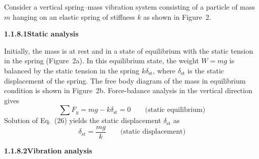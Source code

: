 
Consider a vertical spring--mass vibration system consisting of a particle of mass $m$ hanging on an elastic spring of stiffness $k$ as shown in Figure~2.

{\normalsize\bfseries\color{Graphite} 1.1.8.1\quad Static analysis\par}

Initially, the mass is at rest and in a state of equilibrium with the static tension in the spring (Figure~2a). In this equilibrium state, the weight $W=mg$ is balanced by the static tension in the spring $k\delta_{\mathrm{st}}$, where $\delta_{\mathrm{st}}$ is the static displacement of the spring. The free body diagram of the mass in equilibrium condition is shown in Figure~2b. Force-balance analysis in the vertical direction gives
\begin{equation}
    \sum F_y=mg-k\delta_{\mathrm{st}}=0 \qquad\text{(static equilibrium)} \tag{26}
\end{equation}
Solution of Eq.~(26) yields the static displacement $\delta_{\mathrm{st}}$ as
\begin{equation}
    \delta_{\mathrm{st}}=\frac{mg}{k} \qquad\text{(static displacement)} \tag{27}
\end{equation}

{\normalsize\bfseries\color{Graphite} 1.1.8.2\quad Vibration analysis\par}

